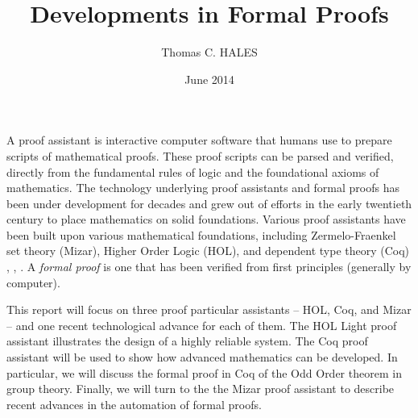 \documentclass[brochure,english,12pt]{bourbaki}
\date{June 2014}
\title{Developments in Formal Proofs}
\author{Thomas C. HALES}
\theoremstyle{plain}
\begin{document}
\maketitle



{





}

\bigskip



A proof assistant is interactive computer software that humans use to prepare scripts of mathematical proofs.
These proof scripts can be parsed and verified, directly from
the fundamental rules of logic and the foundational axioms of mathematics.  
The
technology underlying proof assistants and formal proofs has been under development for decades and grew out
of efforts in the early twentieth century to place mathematics on solid foundations.
Various proof assistants have been built upon various mathematical foundations, including
Zermelo-Fraenkel set theory (Mizar), Higher Order Logic (HOL), and dependent type theory (Coq)
\cite{Mizar}, \cite{HOL}, \cite{Coq}.
A {\it formal proof} is one that has been verified from first principles (generally by computer).  


This report
will focus on three proof particular assistants -- HOL, Coq, and Mizar -- and one recent technological advance for each of them.
The HOL Light proof assistant illustrates the design of a highly reliable system.
The Coq proof assistant will be used to show how advanced mathematics can be developed.  In particular, we will
discuss the formal proof in Coq of the Odd Order theorem in group theory.
Finally, we will turn to the the Mizar proof assistant to describe recent advances in the automation of formal proofs.

\end{document}
